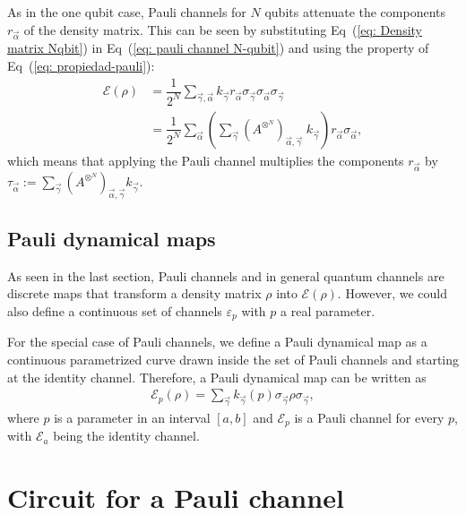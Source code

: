 \documentclass[10pt,letterpaper]{article} %
\newcommand{\eref}[1]{Eq~(\ref{#1})}
\begin{document}
As in the one qubit case, Pauli channels for $N$ qubits 
attenuate the components $r_{\vec{\alpha}}$ of the density matrix.
This can be seen by substituting \eref{eq:  Density matrix Nqbit} in \eref{eq: pauli channel N-qubit}
and using the property of \eref{eq: propiedad-pauli}:
\begin{align*}
\mathcal{E}(\rho) &= \dfrac{1}{2^N} \sum_{\vec{\gamma},\vec{\alpha}} k_{\vec{\gamma}} r_{\vec{\alpha}} \sigma_{\vec{\gamma}} \sigma_{\vec{\alpha}} \sigma_{\vec{\gamma}} \\
& = \dfrac{1}{2^N} \sum_{\vec{\alpha}} \left( \sum_{\vec{\gamma}} {(A^{\otimes^N})}_{\vec{\alpha},\vec{\gamma}} \; k_{\vec{\gamma}} \right) r_{\vec{\alpha}} \sigma_{\vec{\alpha}},
\end{align*}
which means that applying the Pauli channel multiplies the 
components $r_{\vec{\alpha}}$ by $\tau_{\vec{\alpha}} := \sum_{\vec{\gamma}} {(A^{\otimes^N})}_{\vec{\alpha},\vec{\gamma}} k_{\vec{\gamma}}$.
\subsection{Pauli dynamical maps} %
\label{subsec: Pauli Dynamical Maps}


As seen in the last section, Pauli channels and in 
general quantum channels are discrete maps
that transform a density matrix $\rho$ into $\mathcal{E}(\rho)$.
However, we could also define a continuous set of 
channels $\varepsilon_p$ with $p$ a real parameter.

For the special case of Pauli channels, we define 
a Pauli dynamical map as a continuous parametrized 
curve drawn inside the set of Pauli channels and starting at the identity channel. 
Therefore, a Pauli dynamical map can be written as
\begin{eqnarray}
\label{eq: Pauli dynamical map}
\mathcal{E}_p(\rho) = \sum_{\vec{\gamma}} k_{\vec{\gamma}}(p) \sigma_{\vec{\gamma}} \rho \sigma_{\vec{\gamma}},
\end{eqnarray}
where $p$ is a parameter in an interval $[a,b]$ 
and $\mathcal{E}_p$ is a Pauli channel for every $p$, 
with $\mathcal{E}_a$ being the identity channel.

\section{Circuit for a Pauli channel} %
\label{sec: Circuit for a Pauli Channel}
\end{document}

